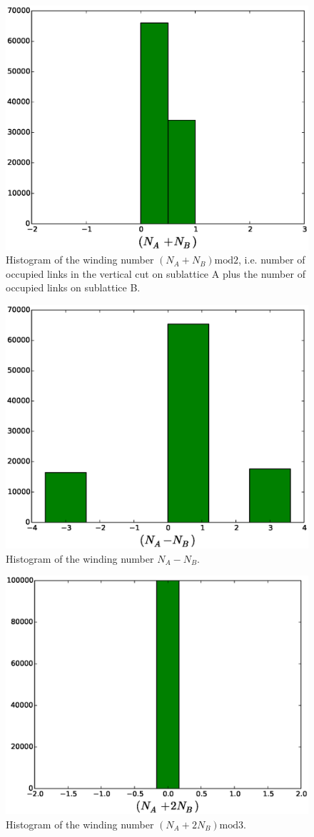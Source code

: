 \documentclass[aps,floatfix,11pt]{revtex4-1}
\begin{document}
\begin{figure}[h]
    \centering
    \includegraphics[width=8.5 cm]{W_vrt_NApNB_str_dmr_mdl}
    \caption{Histogram of the winding number $(N_A + N_B)\mathrm{mod}2$, i.e. number of occupied links in the
    vertical cut on sublattice A plus the number of occupied links on sublattice B.\label{}}
\end{figure}

\begin{figure}[h]
    \centering
    \includegraphics[width=8.5 cm]{W_vrt_NAmNB_str_dmr_mdl}
    \caption{Histogram of the winding number $N_A - N_B$.\label{}}
\end{figure}

\begin{figure}[h]
    \centering
    \includegraphics[width=8.5 cm]{W_vrt_NAp2NB_str_dmr_mdl}
    \caption{Histogram of the winding number $(N_A + 2N_B)\mathrm{mod}3$.\label{}}
\end{figure}
\end{document}
